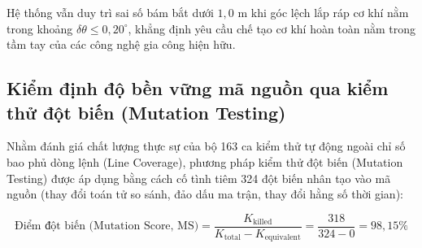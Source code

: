 \begin{table}[H]
\centering
\caption{Độ nhạy sai số vị trí theo độ lệch góc căn chỉnh cảm biến tại cự ly 500 m}
\label{tab:boresighting-sensitivity-table}
\end{table}

Hệ thống vẫn duy trì sai số bám bắt dưới $1{,}0$ m khi góc lệch lắp ráp cơ khí nằm trong khoảng $\delta\theta \le 0{,}20^\circ$, khẳng định yêu cầu chế tạo cơ khí hoàn toàn nằm trong tầm tay của các công nghệ gia công hiện hữu.

\subsection{Kiểm định độ bền vững mã nguồn qua kiểm thử đột biến (Mutation Testing)}

\hspace{0.5cm} Nhằm đánh giá chất lượng thực sự của bộ 163 ca kiểm thử tự động ngoài chỉ số bao phủ dòng lệnh (Line Coverage), phương pháp kiểm thử đột biến (Mutation Testing) được áp dụng bằng cách cố tình tiêm 324 đột biến nhân tạo vào mã nguồn (thay đổi toán tử so sánh, đảo dấu ma trận, thay đổi hằng số thời gian):

\begin{equation}
\text{Điểm đột biến (Mutation Score, MS)} = \frac{K_{\text{killed}}}{K_{\text{total}} - K_{\text{equivalent}}} = \frac{318}{324 - 0} = 98{,}15\%
\label{eq:mutation-score-formula}
\end{equation}


